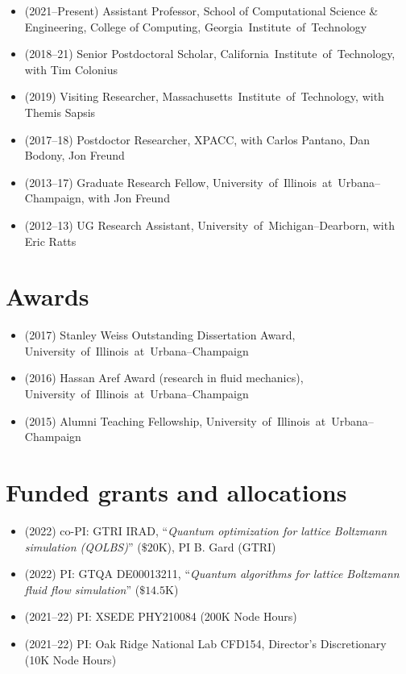 \documentclass[11pt]{article}
\newcommand\GIT{\mbox{Georgia Institute of Technology}\xspace}
\newcommand\CIT{\mbox{California Institute of Technology}\xspace}
\newcommand\MIT{\mbox{Massachusetts Institute of Technology}\xspace}
\newcommand\UIUC{\mbox{University of Illinois at Urbana--Champaign}\xspace}
\newcommand\UMD{\mbox{University of Michigan--Dearborn}\xspace}
\begin{document}
\begin{itemize}
    \item (2021--Present) Assistant Professor, School of Computational Science \& Engineering, College of Computing, \GIT
    \item (2018--21) Senior Postdoctoral Scholar, \CIT, with Tim Colonius
    \item (2019) Visiting Researcher, \MIT, with Themis Sapsis
    \item (2017--18) Postdoctor Researcher, XPACC, with Carlos Pantano, Dan Bodony, Jon Freund
    \item (2013--17) Graduate Research Fellow, \UIUC, with Jon Freund
    \item (2012--13) UG Research Assistant, \UMD, with Eric Ratts
\end{itemize}

\section{Awards}

\begin{itemize}
    \item (2017) Stanley Weiss Outstanding Dissertation Award, \UIUC
    \item (2016) Hassan Aref Award (research in fluid mechanics), \UIUC
    \item (2015) Alumni Teaching Fellowship, \UIUC
\end{itemize}

\section{Funded grants and allocations}

\begin{itemize}
    \item (2022) co-PI: GTRI IRAD, ``\textit{Quantum optimization for lattice Boltzmann simulation (QOLBS)}'' ($\$20$K), PI B. Gard (GTRI)
    \item (2022) PI: GTQA DE00013211, ``\textit{Quantum algorithms for lattice Boltzmann fluid flow simulation}'' ($\$14.5$K)
    \item (2021--22) PI: XSEDE PHY210084 (200K Node Hours)
    \item (2021--22) PI: Oak Ridge National Lab CFD154, Director's Discretionary (10K Node Hours)
\end{itemize}
\end{document}
